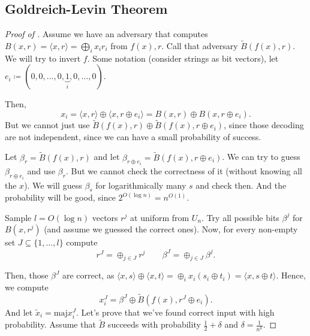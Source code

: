 
\subsection{Goldreich-Levin Theorem}

\begin{proof}[Proof of ] \label{proof:goldreich_levin}
  Assume we have an adversary that computes $B(x, r) = \langle x, r\rangle = \bigoplus_i x_i r_i$ from  $f(x), r$. 
  Call that adversary $\tilde B(f(x), r)$.
  We will try to invert  $f$.
  Some notation (consider strings as bit vectors), let $e_i \coloneqq (0, 0, \ldots, 0, \underbrace{1}_i, 0, \ldots, 0)$.

  Then, 
  \[
    x_i = \langle x, r\rangle \oplus \langle x, r \oplus e_i \rangle = B(x, r) \oplus B(x, r \oplus e_i).
  \] 
  But we cannot just use $\tilde B(f(x), r) \oplus \tilde B(f(x), r \oplus e_i)$, since those decoding are not independent, since we can have a small probability of success.

  Let $\beta_r = \tilde B(f(x), r)$ and let  $\beta_{r \oplus e_i} = \tilde B(f(x), r \oplus e_i)$.
  We can try to guess $\beta_{r \oplus e_i}$ and use $\beta_r$.
  But we cannot check the correctness of it (without knowing all the $x$).
  We will guess $\beta_s$ for logarithmically many  $s$ and check then. 
  And the probability will be good, since $2^{O(\log n)} = n^{O(1)}$.

  Sample $l = O (\log n)$ vectors  $r^j$ at uniform from  $U_n$.
  Try all possible bits  $\beta^j$ for  $B(x, r^j)$ (and assume we guessed the correct ones).
  Now, for every non-empty set  $J \subseteq \{1, \ldots, l\}$ compute
  \[
    r^J = \oplus_{j \in J} r^j \qquad \beta^J = \oplus_{j \in J} \beta^j.
  \] 

  Then, those $\beta^J$ are correct, as  $\langle x, s \rangle \oplus \langle x, t \rangle = \oplus_i x_i (s_i \oplus t_i) = \langle x, s \oplus t \rangle.$
  Hence, we compute 
   \[
    x_{i}^J = \beta^J \oplus \tilde B(f(x), r^J \oplus e_i).
  \] 
  And let $\tilde x_i = \text{maj} x_i^J$.
  Let's prove that we've found correct input with high probability.
  Assume that $\tilde B$ succeeds with probability  $\frac{1}{2} + \delta$ and $\delta = \frac{1}{n^{k}}$.


\end{proof}

